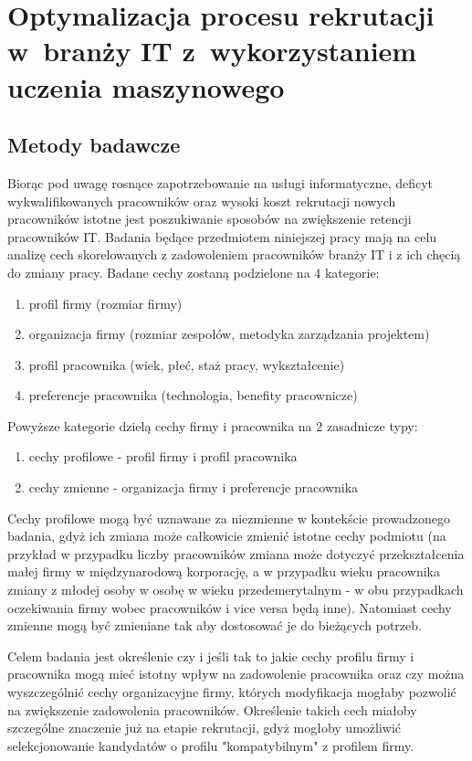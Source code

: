 \chapter{Optymalizacja procesu rekrutacji w~branży IT z~wykorzystaniem uczenia maszynowego}\label{ch:analysis}
\section{Metody badawcze}\label{sec:analysis-method}
Biorąc pod uwagę rosnące zapotrzebowanie na usługi informatyczne, deficyt wykwalifikowanych pracowników \cite{daxx-2021} oraz wysoki koszt rekrutacji nowych pracowników \cite{hairing-dev-2021} istotne jest poszukiwanie sposobów na zwiększenie retencji pracowników IT.
Badania będące przedmiotem niniejszej pracy mają na celu analizę cech skorelowanych z zadowoleniem pracowników branży IT i z ich chęcią do zmiany pracy.
Badane cechy zostaną podzielone na 4 kategorie:
\begin{enumerate}
    \item profil firmy (rozmiar firmy)
    \item organizacja firmy (rozmiar zespołów, metodyka zarządzania projektem)
    \item profil pracownika (wiek, płeć, staż pracy, wykształcenie)
    \item preferencje pracownika (technologia, benefity pracownicze)
    \end{enumerate}

Powyższe kategorie dzielą cechy firmy i pracownika na 2 zasadnicze typy:
\begin{enumerate}
    \item cechy profilowe - profil firmy i profil pracownika
    \item cechy zmienne - organizacja firmy i preferencje pracownika
    \end{enumerate}

Cechy profilowe mogą być uznawane za niezmienne w kontekście prowadzonego badania, gdyż ich zmiana może całkowicie zmienić istotne cechy podmiotu
(na przykład w przypadku liczby pracowników zmiana może dotyczyć przekształcenia małej firmy w międzynarodową korporację, a w przypadku wieku pracownika zmiany z młodej osoby w osobę w wieku przedemerytalnym - w obu przypadkach oczekiwania firmy wobec pracowników i vice versa będą inne).
Natomiast cechy zmienne mogą być zmieniane tak aby dostosować je do bieżących potrzeb.

Celem badania jest określenie czy i jeśli tak to jakie cechy profilu firmy i pracownika mogą mieć istotny wpływ na zadowolenie pracownika
oraz czy można wyszczególnić cechy organizacyjne firmy, których modyfikacja mogłaby pozwolić na zwiększenie zadowolenia pracowników.
Określenie takich cech miałoby szczególne znaczenie już na etapie rekrutacji, gdyż mogłoby umożliwić selekcjonowanie kandydatów o profilu "kompatybilnym" z profilem firmy.


